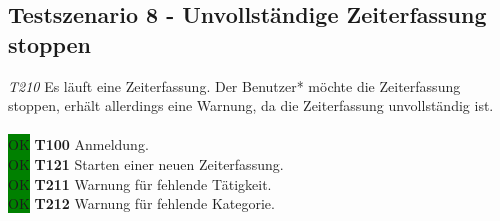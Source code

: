 \subsection{Testszenario 8 - Unvollständige Zeiterfassung stoppen}
\emph{T210} Es läuft eine Zeiterfassung. Der Benutzer* möchte die Zeiterfassung stoppen, erhält allerdings eine Warnung, da die Zeiterfassung unvollständig ist.
\\\\
\colorbox{green}{OK} \textbf{T100} Anmeldung. \\
\colorbox{green}{OK} \textbf{T121} Starten einer neuen Zeiterfassung. \\
\colorbox{green}{OK} \textbf{T211} Warnung für fehlende Tätigkeit. \\
\colorbox{green}{OK} \textbf{T212} Warnung für fehlende Kategorie.
